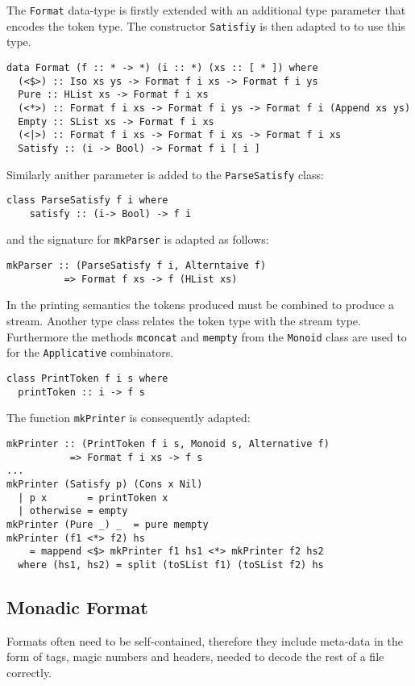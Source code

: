 \documentclass[../Thesis.tex]{subfiles}
\begin{document}
The \texttt{Format} data-type is firstly extended with an additional type parameter that encodes the token type. The constructor \texttt{Satisfiy} is then
adapted to to use this type.

\begin{verbatim}
data Format (f :: * -> *) (i :: *) (xs :: [ * ]) where
  (<$>) :: Iso xs ys -> Format f i xs -> Format f i ys
  Pure :: HList xs -> Format f i xs
  (<*>) :: Format f i xs -> Format f i ys -> Format f i (Append xs ys)
  Empty :: SList xs -> Format f i xs
  (<|>) :: Format f i xs -> Format f i xs -> Format f i xs
  Satisfy :: (i -> Bool) -> Format f i [ i ]
\end{verbatim}

Similarly anither parameter is added to the \texttt{ParseSatisfy} class:
\begin{verbatim}
class ParseSatisfy f i where
	satisfy :: (i-> Bool) -> f i
\end{verbatim}
and the signature for \texttt{mkParser} is adapted as follows:
\begin{verbatim}
mkParser :: (ParseSatisfy f i, Alterntaive f) 
          => Format f xs -> f (HList xs)
\end{verbatim} 

In the printing semantics the tokens produced must be combined to produce a stream. Another type class relates the token type with the stream type.
Furthermore the methods \texttt{mconcat} and \texttt{mempty} from the \texttt{Monoid} class are used to for the \texttt{Applicative} combinators.

\begin{verbatim}
class PrintToken f i s where
  printToken :: i -> f s 
\end{verbatim}

The function \texttt{mkPrinter} is consequently adapted:

\begin{verbatim}
mkPrinter :: (PrintToken f i s, Monoid s, Alternative f) 
           => Format f i xs -> f s
...
mkPrinter (Satisfy p) (Cons x Nil)
  | p x       = printToken x
  | otherwise = empty
mkPrinter (Pure _) _  = pure mempty
mkPrinter (f1 <*> f2) hs 
    = mappend <$> mkPrinter f1 hs1 <*> mkPrinter f2 hs2
  where (hs1, hs2) = split (toSList f1) (toSList f2) hs
\end{verbatim}

\subsection{Monadic Format}
\label{subsec:Monadic}
Formats often need to be self-contained, therefore they include meta-data in the form of tags, magic numbers and headers, needed to decode the rest of a file correctly. 
\end{document}
